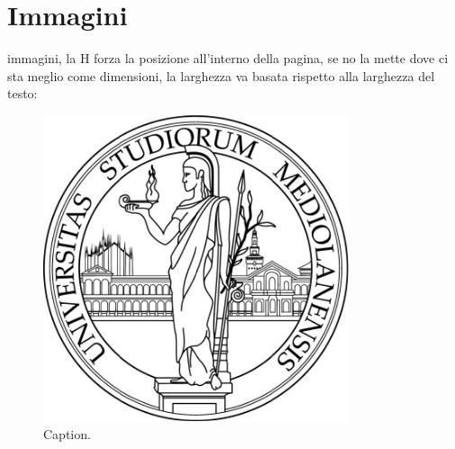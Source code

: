\chapter{Immagini}


immagini, la H forza la posizione all'interno della pagina, se no la mette dove ci sta meglio come dimensioni, la larghezza va basata rispetto alla larghezza del testo:
\begin{figure}[H]
    \centering
    \includegraphics[width=0.8\textwidth]{immagini/unimi.pdf}
    \caption{Caption.}
    \label{fig:unimi}
\end{figure}

